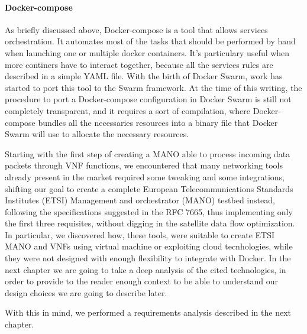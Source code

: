 \paragraph{Docker-compose} As briefly discussed above, Docker-compose is a tool
that allows services orchestration. It automates most of the tasks that should
be performed by hand when launching one or multiple docker containers. It's
particulary useful when more continers have to interact together,
because all the services rules are described in a simple YAML file. With
the birth of Docker Swarm, work has started to port this tool to the Swarm
framework. At the time of this writing, the procedure to port a Docker-compose
configuration in Docker Swarm is still not completely transparent, and it
requires a sort of compilation, where Docker-compose bundles all the necessaries
resources into a binary file that Docker Swarm will use to allocate the
necessary resources.

\vspace{0.5cm}

Starting with the first step of creating a MANO able to process incoming data
packets through VNF functions, we encountered that many networking tools already
present in the market required some tweaking and some integrations, shifting our
goal to create a complete European Telecommunications Standards Institutes
(ETSI) Management and orchestrator (MANO) testbed instead, following the
specifications suggested in the RFC 7665, thus implementing only the first three
requisites, without digging in the satellite data flow optimization. In
particular, we discovered how, these tools, were suitable to create ETSI MANO
and VNFs using virtual machine or exploiting cloud tecnhologies, while they were
not designed with enough flexibility to integrate with Docker. In the next
chapter we are going to take a deep analysis of the cited technologies, in order
to provide to the reader enough context to be able to understand our design
choices we are going to describe later.


\noindent With this in mind, we performed a requirements analysis described in
the next chapter.
 
